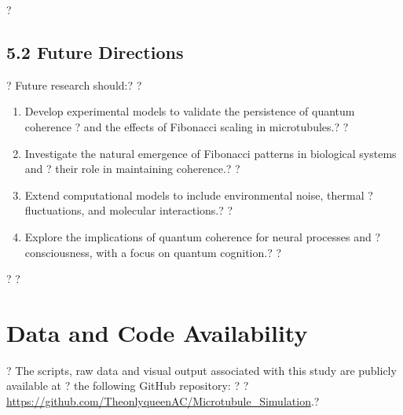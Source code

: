 ?\subsection{5.2 Future Directions}?
Future research should:?
?\begin{enumerate}?
?    \item Develop experimental models to validate the persistence of quantum coherence ?
and the effects of Fibonacci scaling in microtubules.?
?    \item Investigate the natural emergence of Fibonacci patterns in biological systems and ?
their role in maintaining coherence.?
?    \item Extend computational models to include environmental noise, thermal ?
fluctuations, and molecular interactions.?
?    \item Explore the implications of quantum coherence for neural processes and ?
consciousness, with a focus on quantum cognition.?
?\end{enumerate}?
?\section{Data and Code Availability}?
The scripts, raw data and visual output associated with this study are publicly available at ?
the following GitHub repository: ?
?\url{https://github.com/TheonlyqueenAC/Microtubule_Simulation}.?


